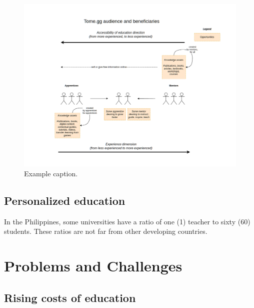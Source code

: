 \documentclass[journal, onecolumn]{IEEEtran}
\newcommand{\tomegg}{
  \href{http://tome.gg}{Tome.gg}
}
\begin{document}


\begin{figure}[t]
  \centering
  \includegraphics[width=\textwidth]{00-tomegg-actors.png}
  \caption{Example caption.}
  \label{fig:example}
\end{figure}

\subsection{Personalized education}

In the Philippines, some universities have a ratio of one (1) teacher to sixty (60)
students. These ratios are not far from other developing countries.

\section{Problems and Challenges} 
\label{sec:problems_challenges}

\subsection{Rising costs of education}
\end{document}
